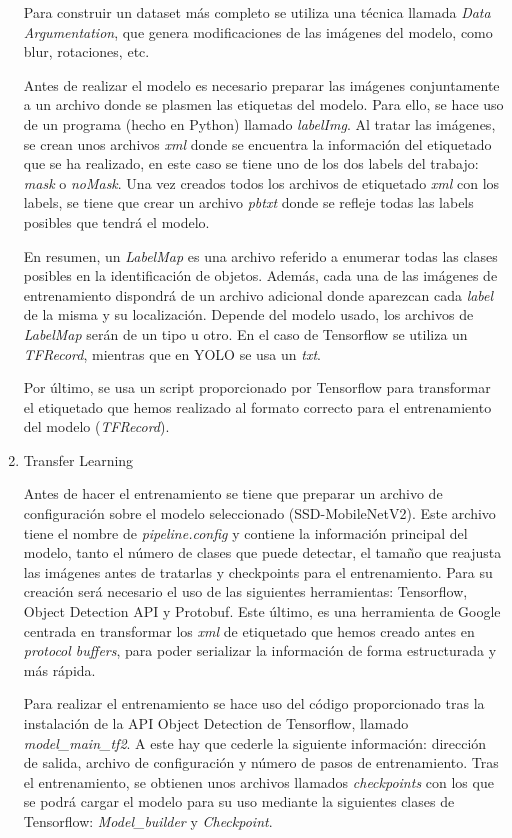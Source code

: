 \begin{enumerate}
	Para construir un dataset más completo se utiliza una técnica llamada \textit{Data Argumentation}, que genera modificaciones de las imágenes del modelo, como blur, rotaciones, etc.
	
	Antes de realizar el modelo es necesario preparar las imágenes conjuntamente a un archivo donde se plasmen las etiquetas del modelo. Para ello, se hace uso de un programa (hecho en Python) llamado \textit{labelImg}. Al tratar las imágenes, se crean unos archivos \textit{xml} donde se encuentra la información del etiquetado que se ha realizado, en este caso se tiene uno de los dos labels del trabajo: \textit{mask} o \textit{noMask}. Una vez creados todos los archivos de etiquetado \textit{xml} con los labels, se tiene que crear un archivo \textit{pbtxt} donde se refleje todas las labels posibles que tendrá el modelo.
	
	En resumen, un \textit{LabelMap} es una archivo referido a enumerar todas las clases posibles en la identificación de objetos. Además, cada una de las imágenes de entrenamiento dispondrá de un archivo adicional donde aparezcan cada \textit{label} de la misma y su localización. Depende del modelo usado, los archivos de \textit{LabelMap} serán de un tipo u otro. En el caso de Tensorflow se utiliza un \textit{TFRecord}, mientras que en YOLO se usa un \textit{txt}.
	
	 Por último, se usa un script proporcionado por Tensorflow para transformar el etiquetado que hemos realizado al formato correcto para el entrenamiento del modelo (\textit{TFRecord}).
	
	\item Transfer Learning
	
	Antes de hacer el entrenamiento se tiene que preparar un archivo de configuración sobre el modelo seleccionado (SSD-MobileNetV2). Este archivo tiene el nombre de \textit{pipeline.config} y contiene la información principal del modelo, tanto el número de clases que puede detectar, el tamaño que reajusta las imágenes antes de tratarlas y checkpoints para el entrenamiento. Para su creación será necesario el uso de las siguientes herramientas: Tensorflow, Object Detection API y Protobuf. Este último, es una herramienta de Google centrada en transformar los \textit{xml} de etiquetado que hemos creado antes en \textit{protocol buffers}, para poder serializar la información de forma estructurada y más rápida.
	
	Para realizar el entrenamiento se hace uso del código proporcionado tras la instalación de la API Object Detection de Tensorflow, llamado \textit{model\_main\_tf2}. A este hay que cederle la siguiente información: dirección de salida, archivo de configuración y número de pasos de entrenamiento. Tras el entrenamiento, se obtienen unos archivos llamados \textit{checkpoints} con los que se podrá cargar el modelo para su uso mediante la siguientes clases de Tensorflow: \textit{Model\_builder} y \textit{Checkpoint}.
	

\end{enumerate}
